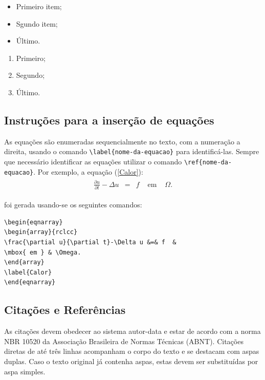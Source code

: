 \documentclass{modelo}
\begin{document}
\begin{itemize} 
\item Primeiro item; 
\item Sgundo item; 
\item Último.
\end{itemize} 

\begin{enumerate} 
\item Primeiro; 
\item Segundo;
\item Último.
\end{enumerate}
 
\subsection{Instruções para a inserção de equações}

As equações são enumeradas sequencialmente no texto, com a numeração a direita, usando o 
comando \verb!\label{nome-da-equacao}! para identificá-las. Sempre que necessário identificar 
as equações utilizar o comando \verb!\ref{nome-da-equacao}!. 
Por exemplo, a equação (\ref{Calor}): 
%
%
\begin{eqnarray}
\begin{array}{rclcc}
\frac{\partial u}{\partial t}-\Delta u &=& f  & \mbox{ em } & \Omega. 
\end{array}
\label{Calor}
\end{eqnarray}


foi gerada usando-se os seguintes comandos: 
\begin{verbatim}
\begin{eqnarray}
\begin{array}{rclcc}
\frac{\partial u}{\partial t}-\Delta u &=& f  &  
\mbox{ em } & \Omega. 
\end{array}
\label{Calor}
\end{eqnarray}
\end{verbatim}  
 
 
\subsection{Citações e Referências} 
  
As citações devem obedecer ao sistema autor-data e estar de acordo com a norma NBR 10520 da Associação Brasileira de Normas Técnicas (ABNT). Citações diretas de até três linhas acompanham o corpo do texto e se destacam com aspas duplas. Caso o texto original já contenha aspas, estas devem ser substituídas por aspa simples. 
\end{document}
